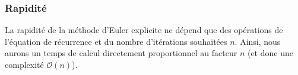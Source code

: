\documentclass[10pt,fleqn]{article} %
\begin{document}
\subsubsection{Rapidité}
La rapidité de la méthode d’Euler explicite ne dépend que des opérations de l’équation de récurrence et du nombre d’itérations souhaitées $n$. Ainsi, nous aurons un temps de calcul directement proportionnel au facteur $n$ (et donc une complexité $\mathcal{O}(n)$).


\end{document}
